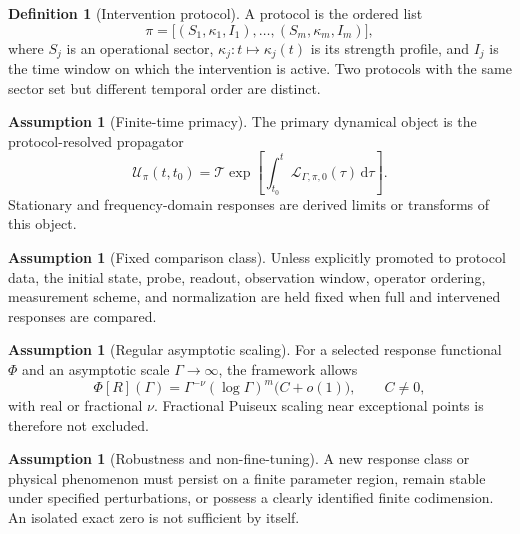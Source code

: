 \documentclass[11pt]{article}
\theoremstyle{definition}
\newtheorem{definition}[theorem]{Definition}
\newtheorem{assumption}[theorem]{Assumption}
\theoremstyle{remark}
\newcommand{\dd}{\,\mathrm d}
\newcommand{\cL}{\mathcal L}
\newcommand{\cU}{\mathcal U}
\newcommand{\PhiF}{\Phi}
\begin{document}
\begin{definition}[Intervention protocol]\label{def:protocol}
A protocol is the ordered list
\begin{equation}
\pi
 = \bigl[(S_1,\kappa_1,I_1),\ldots,(S_m,\kappa_m,I_m)\bigr],
\label{eq:protocol}
\end{equation}
where $S_j$ is an operational sector, $\kappa_j:t\mapsto\kappa_j(t)$ is its strength profile, and $I_j$ is the time window on which the intervention is active. Two protocols with the same sector set but different temporal order are distinct.
\end{definition}

\begin{assumption}[Finite-time primacy]\label{ass:finite-time}
The primary dynamical object is the protocol-resolved propagator
\begin{equation}
\cU_{\pi}(t,t_0)
 = \mathcal T\exp\!\left[
 \int_{t_0}^{t}\cL_{\Gamma,\pi,0}(\tau)\dd\tau
 \right].
\label{eq:propagator}
\end{equation}
Stationary and frequency-domain responses are derived limits or transforms of this object.
\end{assumption}

\begin{assumption}[Fixed comparison class]\label{ass:comparison}
Unless explicitly promoted to protocol data, the initial state, probe, readout, observation window, operator ordering, measurement scheme, and normalization are held fixed when full and intervened responses are compared.
\end{assumption}

\begin{assumption}[Regular asymptotic scaling]\label{ass:regular-variation}
For a selected response functional $\PhiF$ and an asymptotic scale $\Gamma\to\infty$, the framework allows
\begin{equation}
\PhiF[R](\Gamma)
 = \Gamma^{-\nu}(\log\Gamma)^m\bigl(C+o(1)\bigr),
\qquad C\neq0,
\label{eq:regular-variation}
\end{equation}
with real or fractional $\nu$. Fractional Puiseux scaling near exceptional points is therefore not excluded.
\end{assumption}

\begin{assumption}[Robustness and non-fine-tuning]\label{ass:robustness}
A new response class or physical phenomenon must persist on a finite parameter region, remain stable under specified perturbations, or possess a clearly identified finite codimension. An isolated exact zero is not sufficient by itself.
\end{assumption}
\end{document}
